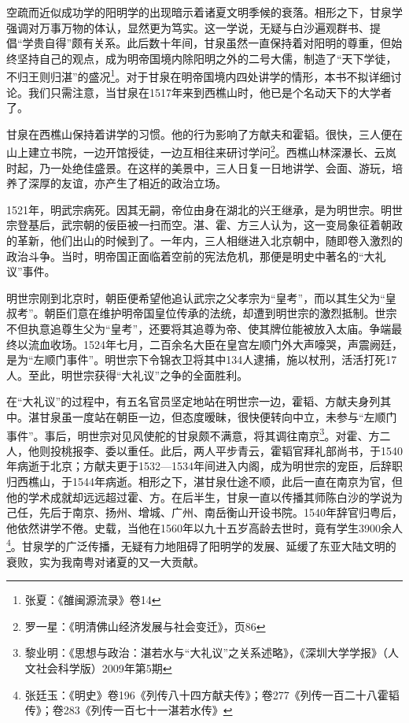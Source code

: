 空疏而近似成功学的阳明学的出现暗示着诸夏文明季候的衰落。相形之下，甘泉学强调对万事万物的体认，显然更为笃实。这一学说，无疑与白沙遍观群书、提倡“学贵自得”颇有关系。此后数十年间，甘泉虽然一直保持着对阳明的尊重，但始终坚持自己的观点，成为明帝国境内除阳明之外的二号大儒，制造了“天下学徒，不归王则归湛”的盛况\footnote{张夏：《雒闽源流录》卷14}。对于甘泉在明帝国境内四处讲学的情形，本书不拟详细讨论。我们只需注意，当甘泉在1517年来到西樵山时，他已是个名动天下的大学者了。

甘泉在西樵山保持着讲学的习惯。他的行为影响了方献夫和霍韬。很快，三人便在山上建立书院，一边开馆授徒，一边互相往来研讨学问\footnote{罗一星：《明清佛山经济发展与社会变迁》，页86}。西樵山林深瀑长、云岚时起，乃一处绝佳盛景。在这样的美景中，三人日复一日地讲学、会面、游玩，培养了深厚的友谊，亦产生了相近的政治立场。

1521年，明武宗病死。因其无嗣，帝位由身在湖北的兴王继承，是为明世宗。明世宗登基后，武宗朝的佞臣被一扫而空。湛、霍、方三人认为，这一变局象征着朝政的革新，他们出山的时候到了。一年内，三人相继进入北京朝中，随即卷入激烈的政治斗争。当时，明帝国正面临着空前的宪法危机，那便是明史中著名的“大礼议”事件。

明世宗刚到北京时，朝臣便希望他追认武宗之父孝宗为“皇考”，而以其生父为“皇叔考”。朝臣们意在维护明帝国皇位传承的法统，却遭到明世宗的激烈抵制。世宗不但执意追尊生父为“皇考”，还要将其追尊为帝、使其牌位能被放入太庙。争端最终以流血收场。1524年七月，二百余名大臣在皇宫左顺门外大声嚎哭，声震阙廷，是为“左顺门事件”。明世宗下令锦衣卫将其中134人逮捕，施以杖刑，活活打死17人。至此，明世宗获得“大礼议”之争的全面胜利。

在“大礼议”的过程中，有五名官员坚定地站在明世宗一边，霍韬、方献夫身列其中。湛甘泉虽一度站在朝臣一边，但态度暧昧，很快便转向中立，未参与“左顺门事件”。事后，明世宗对见风使舵的甘泉颇不满意，将其调往南京\footnote{黎业明：《思想与政治：湛若水与“大礼议”之关系述略》，《深圳大学学报》（人文社会科学版）2009年第5期}。对霍、方二人，他则投桃报李、委以重任。此后，两人平步青云，霍韬官拜礼部尚书，于1540年病逝于北京；方献夫更于1532—1534年间进入内阁，成为明世宗的宠臣，后辞职归西樵山，于1544年病逝。相形之下，湛甘泉仕途不顺，此后一直在南京为官，但他的学术成就却远远超过霍、方。在后半生，甘泉一直以传播其师陈白沙的学说为己任，先后于南京、扬州、增城、广州、南岳衡山开设书院。1540年辞官归粤后，他依然讲学不倦。史载，当他在1560年以九十五岁高龄去世时，竟有学生3900余人\footnote{张廷玉：《明史》卷196《列传八十四方献夫传》；卷277《列传一百二十八霍韬传》；卷283《列传一百七十一湛若水传》}。甘泉学的广泛传播，无疑有力地阻碍了阳明学的发展、延缓了东亚大陆文明的衰败，实为我南粤对诸夏的又一大贡献。

